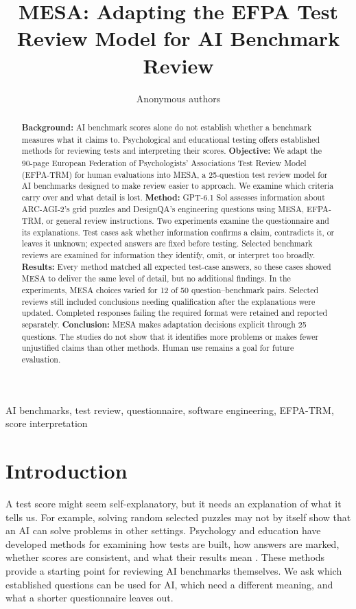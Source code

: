\documentclass[10pt,conference]{IEEEtran}
\begin{document}
\title{MESA: Adapting the EFPA Test Review Model for AI Benchmark Review}
\author{Anonymous authors}
\maketitle
\begin{abstract}
\textbf{Background:} AI benchmark scores alone do not establish whether a benchmark measures what it claims to. Psychological and educational testing offers established methods for reviewing tests and interpreting their scores.
\textbf{Objective:} We adapt the 90-page European Federation of Psychologists' Associations Test Review Model (EFPA-TRM) for human evaluations into MESA, a 25-question test review model for AI benchmarks designed to make review easier to approach. We examine which criteria carry over and what detail is lost.
\textbf{Method:} GPT-6.1 Sol assesses information about ARC-AGI-2's grid puzzles and DesignQA's engineering questions using MESA, EFPA-TRM, or general review instructions. Two experiments examine the questionnaire and its explanations. Test cases ask whether information confirms a claim, contradicts it, or leaves it unknown; expected answers are fixed before testing. Selected benchmark reviews are examined for information they identify, omit, or interpret too broadly.
\textbf{Results:} Every method matched all expected test-case answers, so these cases showed MESA to deliver the same level of detail, but no additional findings. In the experiments, MESA choices varied for 12 of 50 question--benchmark pairs. Selected reviews still included conclusions needing qualification after the explanations were updated. Completed responses failing the required format were retained and reported separately.
\textbf{Conclusion:} MESA makes adaptation decisions explicit through 25 questions. The studies do not show that it identifies more problems or makes fewer unjustified claims than other methods. Human use remains a goal for future evaluation.
\end{abstract}
\begin{IEEEkeywords}
AI benchmarks, test review, questionnaire, software engineering, EFPA-TRM, score interpretation
\end{IEEEkeywords}

\section{Introduction}
A test score might seem self-explanatory, but it needs an explanation of what it tells us. For example, solving random selected puzzles may not by itself show that an AI can solve problems in other settings. Psychology and education have developed methods for examining how tests are built, how answers are marked, whether scores are consistent, and what their results mean \cite{aera_apa_ncme_standards_2014,kane_validation}. These methods provide a starting point for reviewing AI benchmarks themselves. We ask which established questions can be used for AI, which need a different meaning, and what a shorter questionnaire leaves out.
\end{document}
